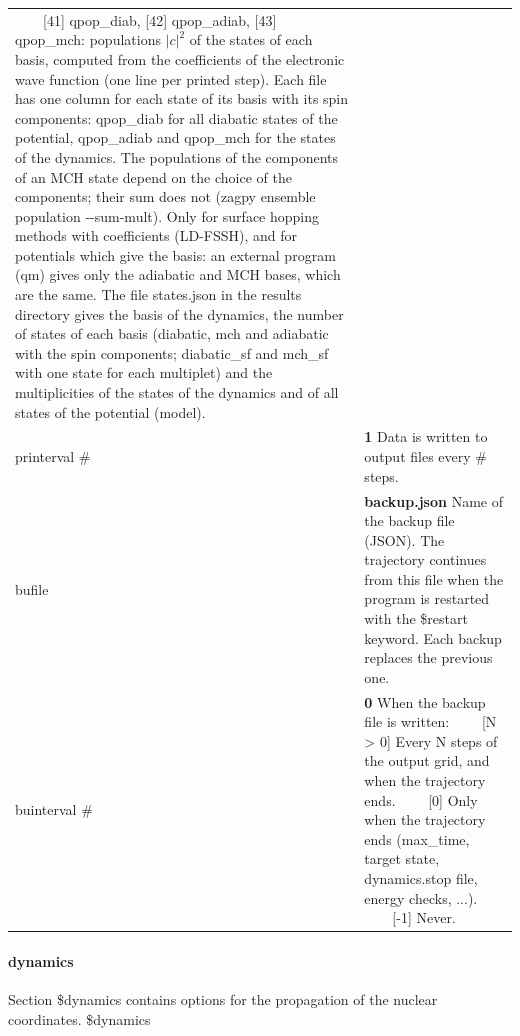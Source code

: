 \documentclass{report}
\newcommand{\tabitem}{~~\llap{--}~~}
\begin{document}
\begin{tabularx}{\textwidth}{ m{2.5cm} X }
	\tabitem [41]  qpop\_diab, [42] qpop\_adiab, [43] qpop\_mch: populations $|c|^2$ of the states of each basis, computed from the coefficients of the electronic wave function (one line per printed step). Each file has one column for each state of its basis with its spin components: qpop\_diab for all diabatic states of the potential, qpop\_adiab and qpop\_mch for the states of the dynamics. The populations of the components of an MCH state depend on the choice of the components; their sum does not (zagpy ensemble population -{}-sum-mult). Only for surface hopping methods with coefficients (LD-FSSH), and for potentials which give the basis: an external program (qm) gives only the adiabatic and MCH bases, which are the same. \newline
	The file states.json in the results directory gives the basis of the dynamics, the number of states of each basis (diabatic, mch and adiabatic with the spin components; diabatic\_sf and mch\_sf with one state for each multiplet) and the multiplicities of the states of the dynamics and of all states of the potential (model). \\

printerval \#	&
	\textbf{1} \newline
	Data is written to output files every \# steps. \\

bufile			&
	\textbf{backup.json} \newline
	Name of the backup file (JSON). The trajectory continues from this file when the program is restarted with the \$restart keyword. Each backup replaces the previous one. \\
	
buinterval \#	&
	\textbf{0} \newline
	When the backup file is written: \newline
	\tabitem [N > 0] Every N steps of the output grid, and when the trajectory ends. \newline
	\tabitem [0] Only when the trajectory ends (max\_time, target state, dynamics.stop file, energy checks, ...). \newline
	\tabitem [-1] Never. \\
\end{tabularx}


\paragraph{dynamics}
Section \$dynamics contains options for the propagation of the nuclear coordinates. \newline
\$dynamics
\end{document}
